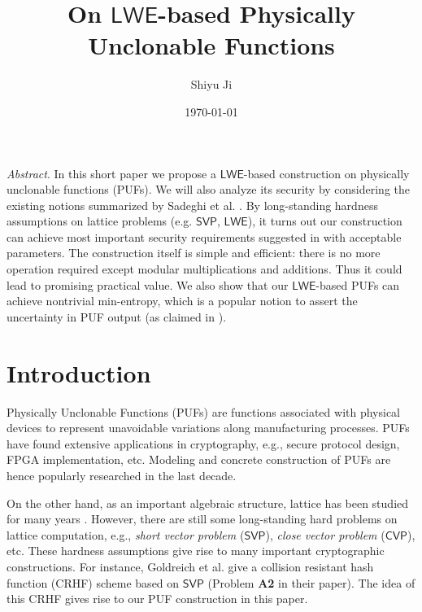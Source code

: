 \documentclass[12pt]{article}
\newcommand{\SVP}{\mathsf{SVP}}
\newcommand{\CVP}{\mathsf{CVP}}
\newcommand{\LWE}{\mathsf{LWE}}
\theoremstyle{definition}
\begin{document}
\title{On $\LWE$-based Physically Unclonable Functions}
\author{Shiyu Ji}
\date{\today}
\maketitle

{\it Abstract}. 
In this short paper we propose a $\LWE$-based construction on physically unclonable functions (PUFs). We will also analyze its security by considering the existing notions summarized by Sadeghi et al. \cite{sadeghi2016towards}. By long-standing hardness assumptions on lattice problems (e.g. $\SVP$, $\LWE$), it turns out our construction can achieve most important security requirements suggested in \cite{sadeghi2016towards} with acceptable parameters. The construction itself is simple and efficient: there is no more operation required except modular multiplications and additions. Thus it could lead to promising practical value. We also show that our $\LWE$-based PUFs can achieve nontrivial min-entropy, which is a popular notion to assert the uncertainty in PUF output (as claimed in \cite{sadeghi2016towards}). 

\section{Introduction}
Physically Unclonable Functions (PUFs) are functions associated with physical devices to represent unavoidable variations along manufacturing processes. PUFs have found extensive applications in cryptography, e.g., secure protocol design, FPGA implementation, etc. \cite{sadeghi2016towards} Modeling and concrete construction of PUFs are hence popularly researched in the last decade.

On the other hand, as an important algebraic structure, lattice has been studied for many years \cite{regev2009lattices}. However, there are still some long-standing hard problems on lattice computation, e.g., \emph{short vector problem} ($\SVP$), \emph{close vector problem} ($\CVP$), etc. These hardness assumptions give rise to many important cryptographic constructions. For instance, Goldreich et al. \cite{goldreich2011collision} give a collision resistant hash function (CRHF) scheme based on $\SVP$ (Problem {\bf A2} in their paper). The idea of this CRHF gives rise to our PUF construction in this paper.
\end{document}
